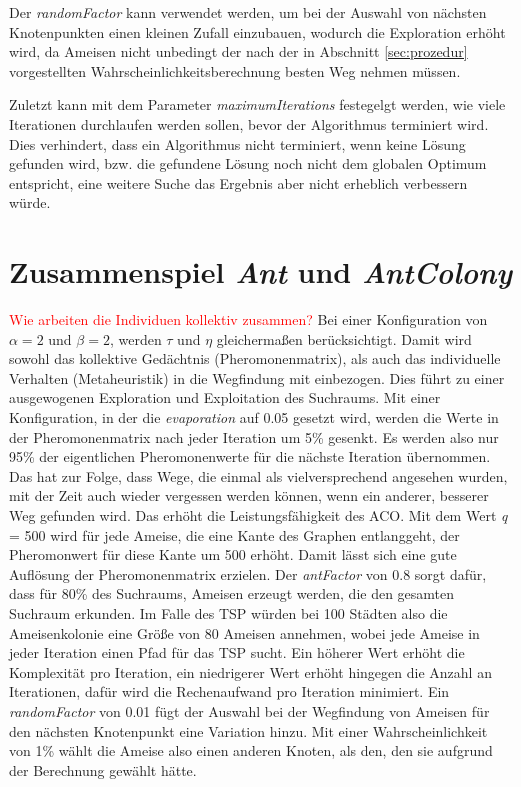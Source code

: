 Der \emph{randomFactor} kann verwendet werden, um bei der Auswahl von
nächsten Knotenpunkten einen kleinen Zufall einzubauen, wodurch die Exploration
erhöht wird, da Ameisen nicht unbedingt der nach der in Abschnitt
\ref{sec:prozedur} vorgestellten Wahrscheinlichkeitsberechnung besten Weg
nehmen müssen.

Zuletzt kann mit dem Parameter \emph{maximumIterations} festegelgt werden,
wie viele Iterationen durchlaufen werden sollen, bevor der Algorithmus
terminiert wird. Dies verhindert, dass ein Algorithmus nicht terminiert, wenn
keine Lösung gefunden wird, bzw. die gefundene Lösung noch nicht dem globalen
Optimum entspricht, eine weitere Suche das Ergebnis aber nicht erheblich
verbessern würde.

\section{Zusammenspiel \emph{Ant} und \emph{AntColony}}

\textcolor{red}{Wie arbeiten die Individuen kollektiv zusammen?}
Bei einer Konfiguration von $\alpha = 2$ und $\beta = 2$, werden $\tau$ und
$\eta$ gleichermaßen berücksichtigt. Damit wird sowohl das kollektive
Gedächtnis (Pheromonenmatrix), als auch das individuelle Verhalten
(Metaheuristik) in die Wegfindung mit einbezogen. Dies führt zu einer
ausgewogenen Exploration und Exploitation des Suchraums. Mit einer
Konfiguration, in der die \emph{evaporation} auf 0.05 gesetzt wird, werden
die Werte in der Pheromonenmatrix nach jeder Iteration um 5\% gesenkt. Es
werden also nur 95\% der eigentlichen Pheromonenwerte für die nächste
Iteration übernommen. Das hat zur Folge, dass Wege, die einmal als
vielversprechend angesehen wurden, mit der Zeit auch wieder vergessen werden
können, wenn ein anderer, besserer Weg gefunden wird. Das erhöht die
Leistungsfähigkeit des ACO. Mit dem Wert \emph{q} = 500 wird für jede Ameise,
die eine Kante des Graphen entlanggeht, der Pheromonwert für diese Kante um
500 erhöht. Damit lässt sich eine gute Auflösung der Pheromonenmatrix
erzielen. Der \emph{antFactor} von 0.8 sorgt dafür, dass für 80\% des
Suchraums, Ameisen erzeugt werden, die den gesamten Suchraum erkunden. Im
Falle des TSP würden bei 100 Städten also die Ameisenkolonie eine Größe von
80 Ameisen annehmen, wobei
jede Ameise in jeder Iteration einen Pfad für das TSP sucht. Ein höherer Wert
erhöht die Komplexität pro Iteration, ein niedrigerer Wert erhöht hingegen
die Anzahl an Iterationen, dafür wird die Rechenaufwand pro Iteration
minimiert.
Ein \emph{randomFactor} von 0.01 fügt der Auswahl bei der Wegfindung von
Ameisen für den nächsten Knotenpunkt eine Variation hinzu. Mit einer
Wahrscheinlichkeit von 1\% wählt die Ameise also einen anderen Knoten, als
den, den sie aufgrund der Berechnung gewählt hätte.
